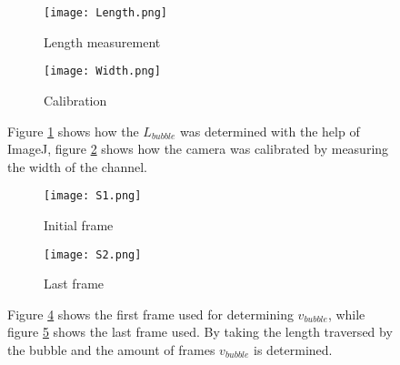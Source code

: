 \begin{figure}
\centering
\begin{subfigure}{0.45\textwidth}
\centering
\texttt{[image: Length.png]}
\caption{Length measurement}
\label{subfig:Length}
\end{subfigure}
\begin{subfigure}{0.45\textwidth}
\centering
\texttt{[image: Width.png]}
\caption{Calibration}
\label{subfig:Width}
\end{subfigure}
\caption{Figure \ref{subfig:Length} shows how the $L_{bubble}$ was determined with the help of ImageJ, figure \ref{subfig:Width} shows how the camera was calibrated by measuring the width of the channel.}
\label{fig:Lengtht}
\end{figure}

\begin{figure}
\centering
\begin{subfigure}{0.45\textwidth}
\centering
\texttt{[image: S1.png]}
\caption{Initial frame}
\label{subfig:s1}
\end{subfigure}
\begin{subfigure}{0.45\textwidth}
\centering
\texttt{[image: S2.png]}
\caption{Last frame}
\label{subfig:s2}
\end{subfigure}
\caption{Figure \ref{subfig:s1} shows the first frame used for determining $v_{bubble}$, while figure \ref{subfig:s2} shows the last frame used. By taking the length traversed by the bubble and the amount of frames $v_{bubble}$ is determined.}
\label{fig:S}
\end{figure}